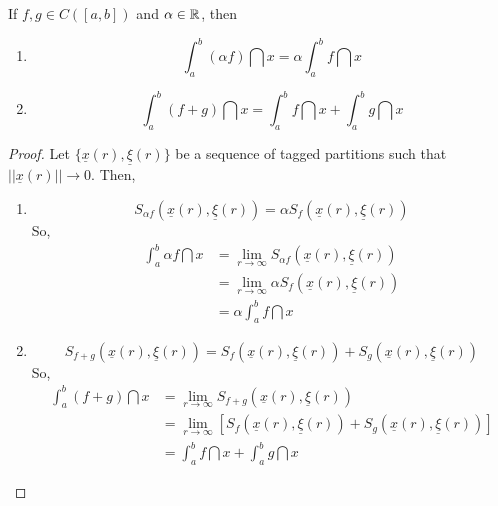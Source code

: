 \begin{theorem}
    If $f, g \in C([a,b])$ and $\alpha \in \mathbb{R}$, then
    \begin{enumerate}
        \item
            \begin{equation}
                \int_a^b (\alpha f) \dint x = \alpha \int_a^b f \dint x
            \end{equation}
        \item
            \begin{equation}
                \int_a^b (f + g)\dint x = \int_a^b f \dint x + \int_a^b g \dint x
            \end{equation}
    \end{enumerate}
\end{theorem}

\begin{proof}
     Let $\{\underline{x}(r), \underline{\xi}(r)\}$ be a sequence of tagged partitions such that $||\underline{x}(r)|| \to 0$. Then,
    \begin{enumerate}
        \item
            \begin{equation*}
                S_{\alpha f} (\underline{x}(r), \underline{\xi}(r))  = \alpha S_f(\underline{x}(r), \underline{\xi}(r))
            \end{equation*}
            So,
            \begin{align*}
                \int_a^b \alpha f \dint x &= \lim \limits_{r \to \infty} S_{\alpha f}(\underline{x}(r), \underline{\xi}(r)) \\
                &= \lim \limits_{r \to \infty} \alpha S_f(\underline{x}(r), \underline{\xi}(r)) \\
                &= \alpha \int_a^b f \dint x
            \end{align*}
        \item 
            \begin{equation*}
                S_{f + g}(\underline{x}(r), \underline{\xi}(r)) = S_f(\underline{x}(r), \underline{\xi}(r)) + S_g(\underline{x}(r), \underline{\xi}(r))
            \end{equation*}
            So,
            \begin{align*}
                \int_a^b (f+g) \dint x &= \lim \limits_{r \to \infty}S_{f + g}(\underline{x}(r), \underline{\xi}(r)) \\
                &= \lim \limits_{r \to \infty}[ S_f(\underline{x}(r), \underline{\xi}(r)) + S_g(\underline{x}(r), \underline{\xi}(r))] \\
                &= \int_a^b f \dint x + \int_a^b g \dint x
            \end{align*}
    \end{enumerate}
\end{proof}